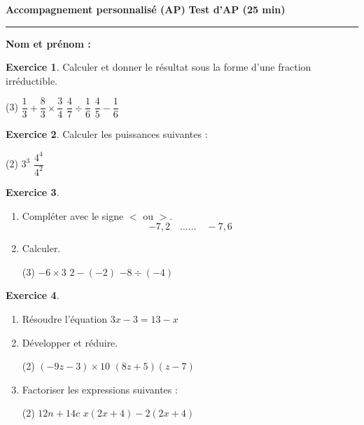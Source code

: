 \documentclass{article}
\theoremstyle{definition}
\newtheorem{exercice}{Exercice}
\begin{document}
\pagestyle{empty}


\Large


{
  \normalsize
  \textbf{\Niveau} \hfill \textbf{Accompagnement personnalisé (AP)} \hfill \textbf{Test d'AP (25 min)}
}
\hrule
\vfill
\textbf{Nom et prénom :}\enspace\dotfill

\begin{exercice}{}{}
Calculer et donner le résultat sous la forme d'une fraction irréductible.
\begin{tasks}(3)
  \task $\dfrac{1}{3} + \dfrac{8}{3} \times \dfrac{3}{4}$
  \task $\dfrac{4}{7}\div\dfrac{1}{6}$
  \task $\dfrac{4}{5}-\dfrac{1}{6}$
\end{tasks}
\end{exercice}

\begin{exercice}{}{}
  Calculer les puissances suivantes :
 \begin{tasks}(2)
  \task $3^3$
  \task $\dfrac{4^{4}}{4^{2}}$%
 \end{tasks}
\end{exercice}


\begin{exercice}{}{}
  \begin{enumerate}
    \item Compléter avec le signe $<$ ou $>$.
  $$ -7,2 \quad \ldots\ldots   \quad-7,6 $$
  
    \item Calculer.


    \begin{tasks}(3)
      \task $ -6  \times 3$
      \task $ 2 - (-2)$
      \task $ -8 \div (-4)$
    \end{tasks}

  \end{enumerate}
\end{exercice}

\begin{exercice}{}{}
  \begin{enumerate}
    \item Résoudre l'équation $3x - 3 = 13 - x$
    \item Développer et réduire.
    \begin{tasks}(2)
      \task $(-9z - 3) \times 10$
      \task $(8z + 5) (z - 7)$
    \end{tasks}
    \item Factoriser les expressions suivantes :
    \begin{tasks}(2)
      \task $12n  + 14c$
      \task $x(2x + 4) - 2(2x + 4)$
    \end{tasks}
  \end{enumerate}
\end{exercice}
\vfill
\end{document}
